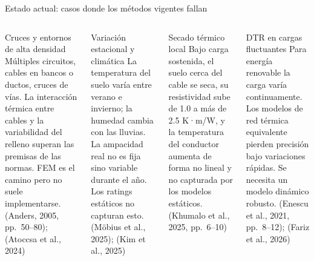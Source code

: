 \documentclass[aspectratio=169]{beamer}
\newcommand{\refcite}[1]{{\footnotesize\color{gray!70!black} #1}}
\begin{document}
\begin{frame}{Estado actual: casos donde los métodos vigentes fallan}

\begin{columns}[T]

\begin{block}{Cruces y entornos de alta densidad}
\small Múltiples circuitos, cables en bancos o ductos, cruces de vías.
La interacción térmica entre cables y la variabilidad del relleno superan
las premisas de las normas. FEM es el camino pero no suele implementarse.
\refcite{(Anders, 2005, pp.~50--80); (Atoccsa et al., 2024)}
\end{block}
\vspace{0.3em}
\begin{block}{Variación estacional y climática}
\small La temperatura del suelo varía entre verano e invierno; la humedad
cambia con las lluvias. La ampacidad real no es fija sino variable durante
el año. Los ratings estáticos no capturan esto.
\refcite{(Möbius et al., 2025); (Kim et al., 2025)}
\end{block}


\begin{block}{Secado térmico local}
\small Bajo carga sostenida, el suelo cerca del cable se seca, su
resistividad sube de 1.0 a más de 2.5 K·m/W, y la temperatura del
conductor aumenta de forma no lineal y no capturada por los modelos
estáticos. \refcite{(Khumalo et al., 2025, pp.~6--10)}
\end{block}
\vspace{0.3em}
\begin{block}{DTR en cargas fluctuantes}
\small Para energía renovable la carga varía continuamente. Los modelos de
red térmica equivalente pierden precisión bajo variaciones rápidas. Se
necesita un modelo dinámico robusto.
\refcite{(Enescu et al., 2021, pp.~8--12); (Fariz et al., 2026)}
\end{block}
\end{columns}
\end{frame}
\end{document}
